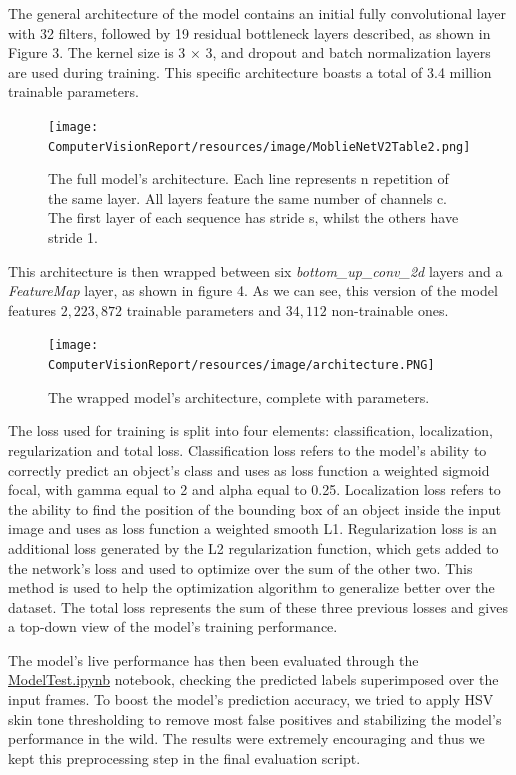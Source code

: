\documentclass[a4paper, 12pt]{article}
\begin{document}
\begin{flushleft}
The general architecture of the model contains an initial fully convolutional layer with 32 filters, followed by 19 residual bottleneck layers described, as shown in Figure 3. The kernel size is 3 × 3, and dropout and batch normalization layers are used during training.
This specific architecture boasts a total of 3.4 million trainable parameters.

\begin{figure}[!h]
    \centering
    \texttt{[image: ComputerVisionReport/resources/image/MoblieNetV2Table2.png]} \caption{The full model's architecture. Each line represents n repetition of the same layer. All layers feature the same number of channels c. The first layer of each sequence has stride s, whilst the others have stride 1.}
\end{figure}
\label{figure3}

This architecture is then wrapped between six \textit{bottom\_up\_conv\_2d} layers and a \textit{FeatureMap} layer, as shown in figure 4.
As we can see, this version of the model features $2,223,872$ trainable parameters and $34,112$ non-trainable ones.\linebreak

\begin{figure}[!h]
    \centering
    \texttt{[image: ComputerVisionReport/resources/image/architecture.PNG]} \caption{The wrapped model's architecture, complete with parameters.}
\end{figure}
\label{figure4}

The loss used for training is split into four elements: classification, localization, regularization and total loss.
Classification loss refers to the model's ability to correctly predict an object's class and uses as loss function a weighted sigmoid focal, with gamma equal to 2 and alpha equal to 0.25.
Localization loss refers to the ability to find the position of the bounding box of an object inside the input image and uses as loss function a weighted smooth L1.
Regularization loss is an additional loss generated by the L2 regularization function, which gets added to the network's loss and used to optimize over the sum of the other two. This method is used to help the optimization algorithm to generalize better over the dataset.
The total loss represents the sum of these three previous losses and gives a top-down view of the model's training performance.\linebreak

The model's live performance has then been evaluated through the \href{https://github.com/MarzioVallero/ML-Based-Blender-Gestural-Input-Interface/blob/master/ModelTest.ipynb}{ModelTest.ipynb} notebook, checking the predicted labels superimposed over the input frames.\linebreak
To boost the model's prediction accuracy, we tried to apply HSV skin tone thresholding to remove most false positives and stabilizing the model's performance in the wild. The results were extremely encouraging and thus we kept this preprocessing step in the final evaluation script.

\end{flushleft}
\end{document}
